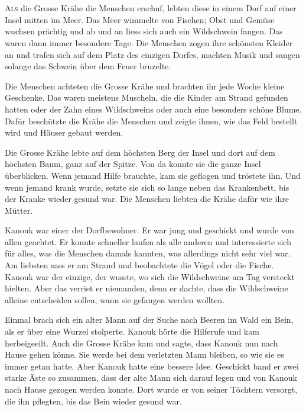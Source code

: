\chapter*{}
\lettrine[lines=3]{\color{red}A}{ls} die Grosse Krähe die Menschen erschuf, lebten diese in einem Dorf auf einer Insel mitten im Meer. Das Meer wimmelte von Fischen; Obst und Gemüse wuchsen prächtig und ab und an liess sich auch ein Wildschwein fangen. Das waren dann immer besondere Tage. Die Menschen zogen ihre schönsten Kleider an und trafen sich auf dem Platz des einzigen Dorfes, machten Musik und sangen solange das Schwein über dem Feuer bruzelte.

Die Menschen achteten die Grosse Krähe und brachten ihr jede Woche kleine Geschenke. Das waren meistens Muscheln, die die Kinder am Strand gefunden hatten oder der Zahn eines Wildschweins oder auch eine besonders schöne Blume. Dafür beschützte die Krähe die Menschen und zeigte ihnen, wie das Feld bestellt wird und Häuser gebaut werden.

Die Grosse Krähe lebte auf dem höchsten Berg der Insel und dort auf dem höchsten Baum, ganz auf der Spitze. Von da konnte sie die ganze Insel überblicken. Wenn jemand Hilfe brauchte, kam sie geflogen und tröstete ihn. Und wenn jemand krank wurde, setzte sie sich so lange neben das Krankenbett, bis der Kranke wieder gesund war. Die Menschen liebten die Krähe dafür wie ihre Mütter.

Kanouk war einer der Dorfbewohner. Er war jung und geschickt und wurde von allen geachtet. Er konnte schneller laufen als alle anderen und interessierte sich für alles, was die Menschen damals kannten, was allerdings nicht sehr viel war. Am liebsten sass er am Strand und beobachtete die Vögel oder die Fische. Kanouk war der einzige, der wusste, wo sich die Wildschweine am Tag versteckt hielten. Aber das verriet er niemanden, denn er dachte, dass die Wildschweine alleine entscheiden sollen, wann sie gefangen werden wollten.

Einmal brach sich ein alter Mann auf der Suche nach Beeren im Wald ein Bein, als er über eine Wurzel stolperte. Kanouk hörte die Hilferufe und kam herbeigeeilt. Auch die Grosse Krähe kam und sagte, dass Kanouk nun nach Hause gehen könne. Sie werde bei dem verletzten Mann bleiben, so wie sie es immer getan hatte. Aber Kanouk hatte eine bessere Idee. Geschickt band er zwei starke Äste so zusammen, dass der alte Mann sich darauf legen und von Kanouk nach Hause gezogen werden konnte. Dort wurde er von seiner Töchtern versorgt, die ihn pflegten, bis das Bein wieder gesund war.


